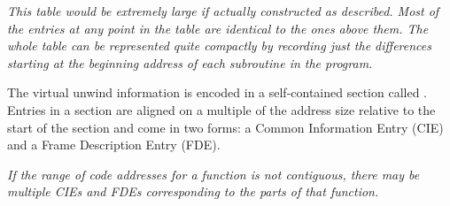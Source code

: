 \textit{This table would be extremely large if actually constructed
as described. Most of the entries at any point in the table
are identical to the ones above them. The whole table can be
represented quite compactly by recording just the differences
starting at the beginning address of each subroutine in
the program.}

The virtual unwind information is encoded in a self-contained
section called 
\dotdebugframe{}.  Entries in a 
\dotdebugframe{} section
are aligned on a multiple of the address size relative to
the start of the section and come in two forms: a Common
Information Entry (CIE) and a 
Frame Description Entry (FDE).

\textit{If the range of code addresses for a function is not
contiguous, there may be multiple CIEs and FDEs corresponding
to the parts of that function.}


